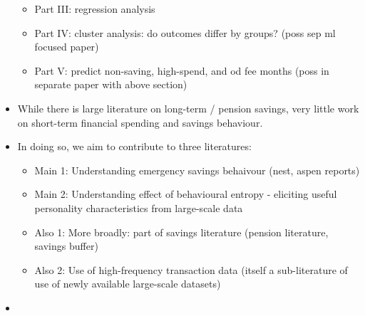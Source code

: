 \begin{itemize}
\begin{itemize}
            \item Part III: regression analysis

            \item Part IV: cluster analysis: do outcomes differ by groups? (poss sep ml
                focused paper)

            \item Part V: predict non-saving, high-spend, and od fee months (poss in
                separate paper with above section)

        \end{itemize}


    \item While there is large literature on long-term / pension savings, very
        little work on short-term financial spending and savings behaviour.

    \item In doing so, we aim to contribute to three literatures:

    \begin{itemize}

        \item Main 1: Understanding emergency savings behaivour (nest, aspen reports)

        \item Main 2: Understanding effect of behavioural entropy - eliciting
            useful personality characteristics from large-scale data

        \item Also 1: More broadly: part of savings literature (pension literature,
            savings buffer)

        \item Also 2: Use of high-frequency transaction data (itself a sub-literature of
            use of newly available large-scale datasets)
    \end{itemize}
    \item
\end{itemize}







